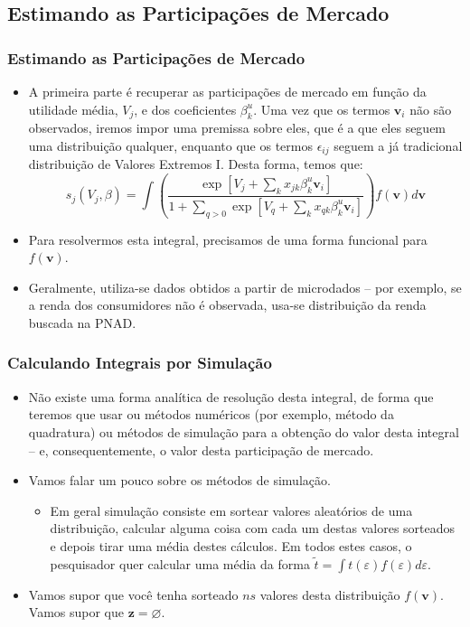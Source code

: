 \documentclass{beamer}
\begin{document}
\subsection{Estimando as Participações de Mercado}
\begin{frame}\frametitle{Estimando as Participações de Mercado}

\begin{itemize}
\item A primeira parte é recuperar as participações de mercado em função
da utilidade média, $V_{j}$, e dos coeficientes $\beta_{k}^{u}$.
Uma vez que os termos $\mathbf{v}_{i}$ não são observados, iremos
impor uma premissa sobre eles, que é a que eles seguem uma distribuição
qualquer, enquanto que os termos $\epsilon_{ij}$ seguem a já tradicional
distribuição de Valores Extremos I. Desta forma, temos que:
\[
s_{j}(V_{j},\beta)=\int\left(\frac{\exp[V_{j}+\sum_{k}x_{jk}\beta_{k}^{u}\mathbf{v}_{i}]}{1+\sum_{q>0}\exp[V_{q}+\sum_{k}x_{qk}\beta_{k}^{u}\mathbf{v}_{i}]}\right)f(\mathbf{v})d\mathbf{v}
\]
\item Para resolvermos esta integral, precisamos de uma forma funcional
para $f(\mathbf{v})$. 
\item Geralmente, utiliza-se dados obtidos a partir de microdados --
por exemplo, se a renda dos consumidores não é observada, usa-se distribuição
da renda buscada na PNAD.
\end{itemize}
\end{frame}

\begin{frame}\frametitle{Calculando Integrais por Simulação}

\begin{itemize}
\item Não existe uma forma analítica de resolução desta integral, de forma
que teremos que usar ou métodos numéricos (por exemplo, método da
quadratura) ou métodos de simulação para a obtenção do valor desta
integral -- e, consequentemente, o valor desta participação
de mercado. 
\item Vamos falar um pouco sobre os métodos de simulação.

\begin{itemize}
\item Em geral simulação consiste em sortear valores aleatórios de uma distribuição,
calcular alguma coisa com cada um destas valores sorteados e depois
tirar uma média destes cálculos. Em todos estes casos, o pesquisador
quer calcular uma média da forma $\tilde{t}=\int t(\varepsilon)f(\varepsilon)d\varepsilon$.
\end{itemize}
\item Vamos supor que você tenha sorteado $ns$ valores desta distribuição
$f(\mathbf{v})$. Vamos supor que $\mathbf{z}=\varnothing$.
\end{itemize}
\end{frame}
\end{document}

